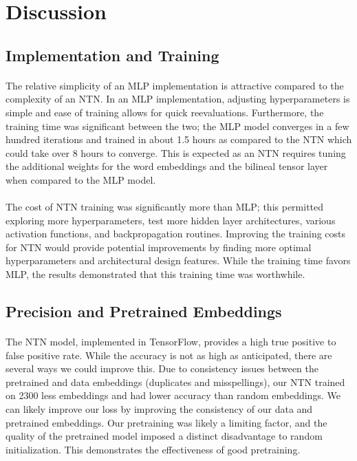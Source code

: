 \documentclass[11.5pt]{article}
\begin{document}
\section{Discussion}

\subsection{Implementation and Training}
\paragraph{} The relative simplicity of an MLP implementation is attractive compared to the complexity of an NTN. In an MLP implementation, adjusting hyperparameters is simple and ease of training allows for quick reevaluations. Furthermore, the training time was significant between the two; the MLP model converges in a few hundred iterations and trained in about 1.5 hours as compared to the NTN which could take over 8 hours to converge. This is expected as an NTN requires tuning the additional weights for the word embeddings and the bilineal tensor layer when compared to the MLP model.

\paragraph{}The cost of NTN training was significantly more than MLP; this permitted exploring more hyperparameters, test more hidden layer architectures, various activation functions, and backpropagation routines. Improving the training costs for NTN would provide potential improvements by finding more optimal hyperparameters and architectural design features. While the training time favors MLP, the results demonstrated that this training time was worthwhile.

\subsection{Precision and Pretrained Embeddings}
\paragraph{} The NTN model, implemented in  TensorFlow, provides a high true positive to false positive rate. While the accuracy is not as high as anticipated, there are several ways we could improve this. Due to consistency issues between the pretrained and data embeddings (duplicates and misspellings), our NTN trained on 2300 less embeddings and had lower accuracy than random embeddings. We can likely improve our loss by improving the consistency of our data and pretrained embeddings. Our pretraining was likely a limiting factor, and the quality of the pretrained model imposed a distinct disadvantage to random initialization. This demonstrates the effectiveness of good pretraining.
\end{document}
